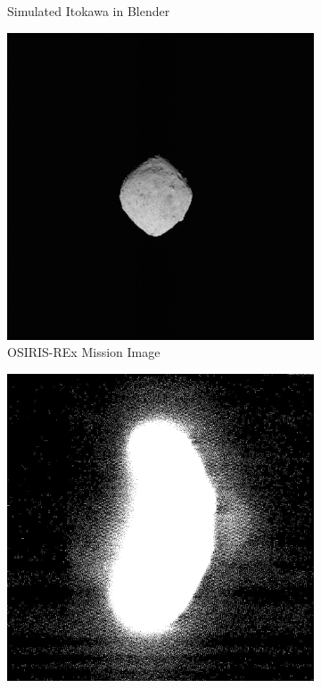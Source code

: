 \begin{figure}
\begin{subfigure}{0.23\textwidth}
         \caption{Simulated Itokawa in Blender}
         \label{fig:three sin x}
     \end{subfigure}
     
     \begin{subfigure}{0.23\textwidth}
         \centering
         \includegraphics[width=\textwidth, height = \textwidth]{fig/image_69.png}
         \caption{OSIRIS-REx Mission Image}
         \label{fig:y equals x}
     \end{subfigure}
    \hfill
     \begin{subfigure}{0.23\textwidth}
         \centering
         \includegraphics[width=\textwidth, height = \textwidth]{fig/st_2423026558_v.png}

\end{subfigure}
\end{figure}
